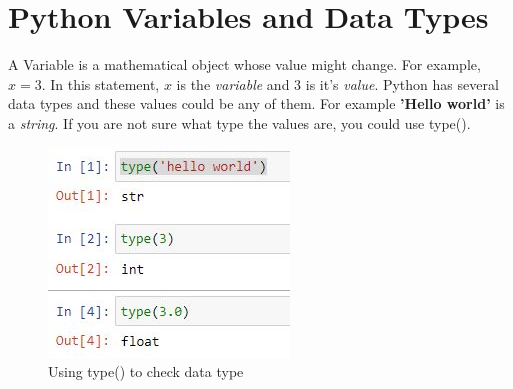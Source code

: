 \chapter{Python Variables and Data Types}
A Variable is a mathematical object whose value might change. For example, $x=3$. In this statement, $x$ is the \textit{variable} and 3 is it's \textit{value}. Python has several data types and these values could be any of them. For example \textbf{'Hello world'} is a \textit{string}. If you are not sure what type the values are, you could use type().
\begin{figure}[ht]
	\centering
	\includegraphics{"Assets/Images/data type/type"}
	\caption{Using type() to check data type}
	\label{fig:type()}
\end{figure}
